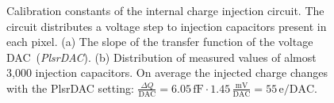 %

\begin{figure}
	\centering
  \caption{\textbf{}Calibration constants of the internal charge injection circuit. The circuit distributes a voltage step to injection capacitors present in each pixel. (a) The slope of the transfer function of the voltage DAC~(\textit{PlsrDAC}). (b) Distribution of measured values of almost 3,000 injection capacitors. On average the injected charge changes with the PlsrDAC setting: $\frac{\Delta Q}{\mathrm{DAC}} = 6.05\,\mathrm{fF} \cdot 1.45\,\frac{\mathrm{mV}}{\mathrm{DAC}} = 55\,\mathrm{e} / \mathrm{DAC}$.}
	\label{fig:calibration_results}
\end{figure}



